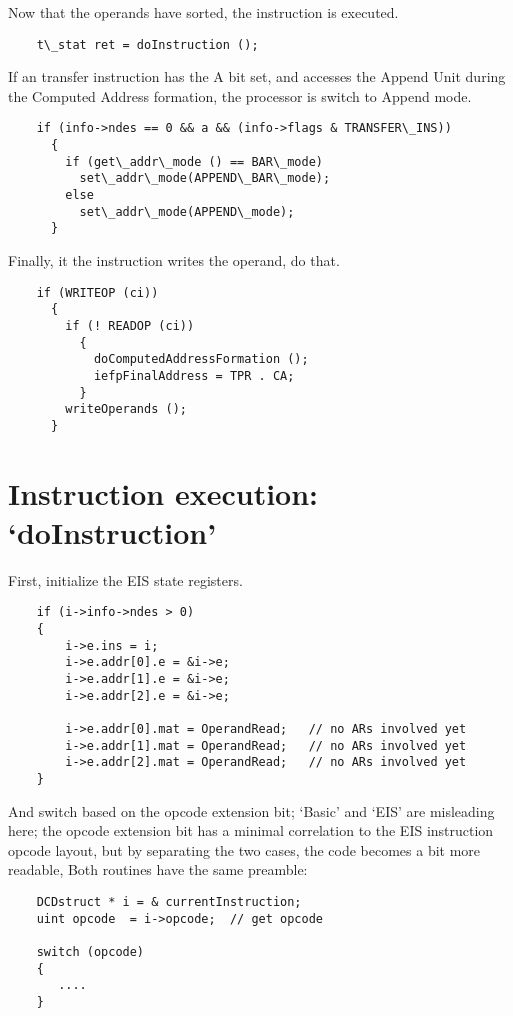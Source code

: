 \documentclass[notitlepage]{report}
\begin{document}
Now that the operands have sorted, the instruction is executed.

\begin{verbatim}
    t\_stat ret = doInstruction ();
\end{verbatim}

If an transfer instruction has the A bit set, and accesses the Append Unit
during the Computed Address formation, the processor is switch to Append
mode.

\begin{verbatim}
    if (info->ndes == 0 && a && (info->flags & TRANSFER\_INS))
      {
        if (get\_addr\_mode () == BAR\_mode)
          set\_addr\_mode(APPEND\_BAR\_mode);
        else
          set\_addr\_mode(APPEND\_mode);
      }
\end{verbatim}

Finally, it the instruction writes the operand, do that.

\begin{verbatim}
    if (WRITEOP (ci))
      {
        if (! READOP (ci))
          {
            doComputedAddressFormation ();
            iefpFinalAddress = TPR . CA;
          }
        writeOperands ();
      }
\end{verbatim}

\section{Instruction execution: `doInstruction'}

First, initialize the EIS state registers.

\begin{verbatim}
    if (i->info->ndes > 0)
    {
        i->e.ins = i;
        i->e.addr[0].e = &i->e;
        i->e.addr[1].e = &i->e;
        i->e.addr[2].e = &i->e;

        i->e.addr[0].mat = OperandRead;   // no ARs involved yet
        i->e.addr[1].mat = OperandRead;   // no ARs involved yet
        i->e.addr[2].mat = OperandRead;   // no ARs involved yet
    }
\end{verbatim}

And switch based on the opcode extension bit; `Basic' and `EIS' are
misleading here; the opcode extension bit has a minimal correlation to
the EIS instruction opcode layout, but by separating the two cases,
the code becomes a bit more readable, Both routines have the same
preamble:

\begin{verbatim}
    DCDstruct * i = & currentInstruction;
    uint opcode  = i->opcode;  // get opcode

    switch (opcode)
    {
       ....
    }
\end{verbatim}
\end{document}

